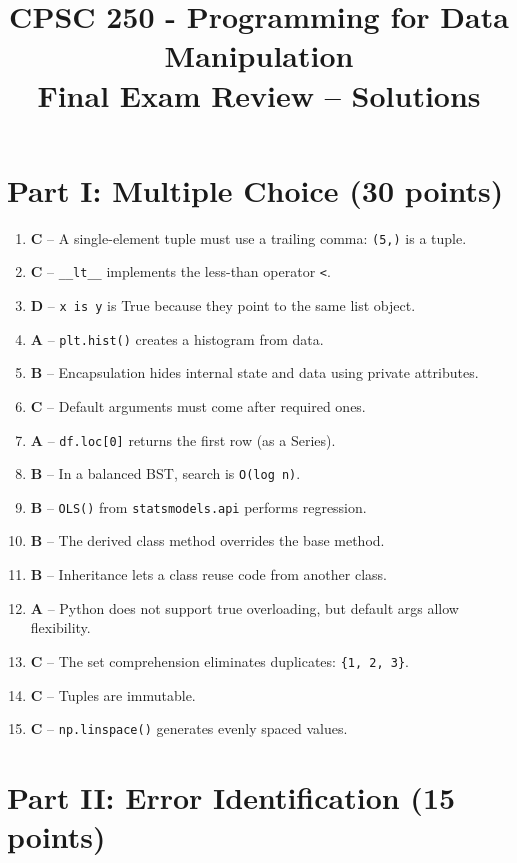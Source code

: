 \documentclass[12pt]{article}
\title{CPSC 250 - Programming for Data Manipulation \\ Final Exam Review – Solutions}
\date{}
\begin{document}
\maketitle

\section*{Part I: Multiple Choice (30 points)}

\begin{enumerate}[label=\arabic*.]
\item \textbf{C} – A single-element tuple must use a trailing comma: \texttt{(5,)} is a tuple.
\item \textbf{C} – \texttt{\_\_lt\_\_} implements the less-than operator \texttt{<}.
\item \textbf{D} – \texttt{x is y} is True because they point to the same list object.
\item \textbf{A} – \texttt{plt.hist()} creates a histogram from data.
\item \textbf{B} – Encapsulation hides internal state and data using private attributes.
\item \textbf{C} – Default arguments must come after required ones.
\item \textbf{A} – \texttt{df.loc[0]} returns the first row (as a Series).
\item \textbf{B} – In a balanced BST, search is \texttt{O(log n)}.
\item \textbf{B} – \texttt{OLS()} from \texttt{statsmodels.api} performs regression.
\item \textbf{B} – The derived class method overrides the base method.
\item \textbf{B} – Inheritance lets a class reuse code from another class.
\item \textbf{A} – Python does not support true overloading, but default args allow flexibility.
\item \textbf{C} – The set comprehension eliminates duplicates: \texttt{\{1, 2, 3\}}.
\item \textbf{C} – Tuples are immutable.
\item \textbf{C} – \texttt{np.linspace()} generates evenly spaced values.

\end{enumerate}

\newpage
\section*{Part II: Error Identification (15 points)}
\end{document}
